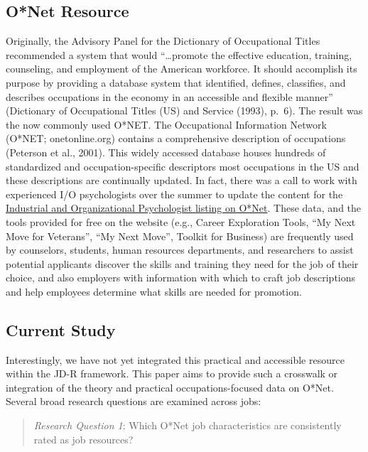 \documentclass[
  english,
  man]{apa6}
\begin{document}
\hypertarget{onet-resource}{%
\subsection{O*Net Resource}\label{onet-resource}}

Originally, the Advisory Panel for the Dictionary of Occupational Titles recommended a system that would \enquote{\ldots promote the effective education, training, counseling, and employment of the American workforce. It should accomplish its purpose by providing a database system that identified, defines, classifies, and describes occupations in the economy in an accessible and flexible manner} (Dictionary of Occupational Titles (US) and Service (1993), p.~6). The result was the now commonly used O*NET. The Occupational Information Network (O*NET; onetonline.org) contains a comprehensive description of occupations (Peterson et al., 2001). This widely accessed database houses hundreds of standardized and occupation-specific descriptors most occupations in the US and these descriptions are continually updated. In fact, there was a call to work with experienced I/O psychologists over the summer to update the content for the \href{https://www.onetonline.org/link/summary/19-3032.00}{Industrial and Organizational Psychologist listing on O*Net}. These data, and the tools provided for free on the website (e.g., Career Exploration Tools, \enquote{My Next Move for Veterans}, \enquote{My Next Move}, Toolkit for Business) are frequently used by counselors, students, human resources departments, and researchers to assist potential applicants discover the skills and training they need for the job of their choice, and also employers with information with which to craft job descriptions and help employees determine what skills are needed for promotion.

\hypertarget{current-study}{%
\subsection{Current Study}\label{current-study}}

Interestingly, we have not yet integrated this practical and accessible resource within the JD-R framework. This paper aims to provide such a crosswalk or integration of the theory and practical occupations-focused data on O*Net. Several broad research questions are examined across jobs:

\begin{quote}
\emph{Research Question 1}: Which O*Net job characteristics are consistently rated as job resources?
\end{quote}
\end{document}
